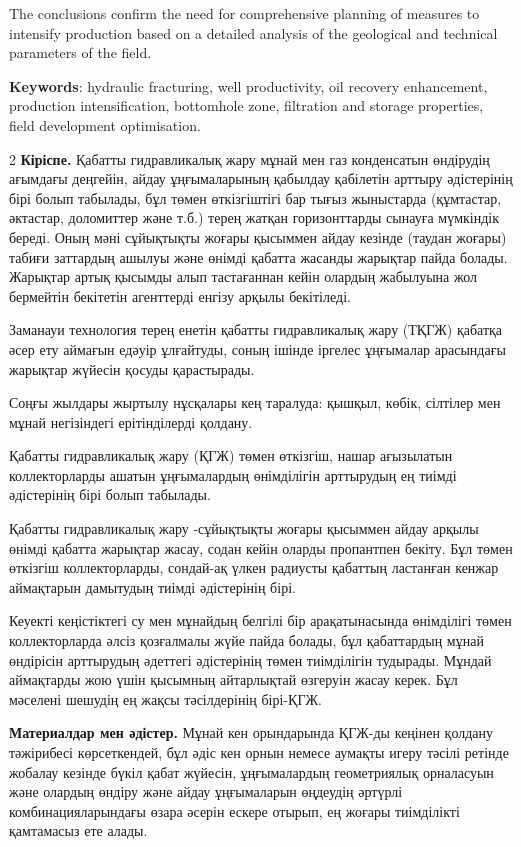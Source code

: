 The conclusions confirm the need for comprehensive planning of measures
to intensify production based on a detailed analysis of the geological
and technical parameters of the field.

{\bfseries Keywords}: hydraulic fracturing, well productivity, oil recovery
enhancement, production intensifica\-tion, bottomhole zone, filtration and
storage properties, field development optimisation.

\begin{multicols}{2}
{\bfseries Кіріспе.} Қабатты гидравликалық жару мұнай мен газ конденсатын
өндірудің ағымдағы деңгейін, айдау ұңғымаларының қабылдау қабілетін
арттыру әдістерінің бірі болып табылады, бұл төмен өткізгіштігі бар
тығыз жыныстарда (құмтастар, әктастар, доломиттер және т.б.) терең
жатқан горизонттарды сынауға мүмкіндік береді. Оның мәні сұйықтықты
жоғары қысыммен айдау кезінде (таудан жоғары) табиғи заттардың ашылуы
және өнімді қабатта жасанды жарықтар пайда болады. Жарықтар артық
қысымды алып тастағаннан кейін олардың жабылуына жол бермейтін бекітетін
агенттерді енгізу арқылы бекітіледі.

Заманауи технология терең енетін қабатты гидравликалық жару (ТҚГЖ)
қабатқа әсер ету аймағын едәуір ұлғайтуды, соның ішінде іргелес
ұңғымалар арасындағы жарықтар жүйесін қосуды қарастырады.

Соңғы жылдары жыртылу нұсқалары кең таралуда: қышқыл, көбік, сілтілер
мен мұнай негізіндегі ерітінділерді қолдану.

Қабатты гидравликалық жару (ҚГЖ) төмен өткізгіш, нашар ағызылатын
коллекторларды ашатын ұңғымалардың өнімділігін арттырудың ең тиімді
әдістерінің бірі болып табылады.

Қабатты гидравликалық жару -сұйықтықты жоғары қысыммен айдау арқылы
өнімді қабатта жарықтар жасау, содан кейін оларды пропантпен бекіту. Бұл
төмен өткізгіш коллекторларды, сондай-ақ үлкен радиусты қабаттың
ластанған кенжар аймақтарын дамытудың тиімді әдістерінің бірі.

Кеуекті кеңістіктегі су мен мұнайдың белгілі бір арақатынасында
өнімділігі төмен коллекторларда әлсіз қозғалмалы жүйе пайда болады, бұл
қабаттардың мұнай өндірісін арттырудың әдеттегі әдістерінің төмен
тиімділігін тудырады. Мұндай аймақтарды жою үшін қысымның айтарлықтай
өзгеруін жасау керек. Бұл мәселені шешудің ең жақсы тәсілдерінің
бірі-ҚГЖ.

{\bfseries Материалдар мен әдістер.} Мұнай кен орындарында ҚГЖ-ды кеңінен
қолдану тәжірибесі көрсеткендей, бұл әдіс кен орнын немесе аумақты игеру
тәсілі ретінде жобалау кезінде бүкіл қабат жүйесін, ұңғымалардың
геометриялық орналасуын және олардың өндіру және айдау ұңғымаларын
өңдеудің әртүрлі комбинацияларындағы өзара әсерін ескере отырып, ең
жоғары тиімділікті қамтамасыз ете алады.


\end{multicols}
